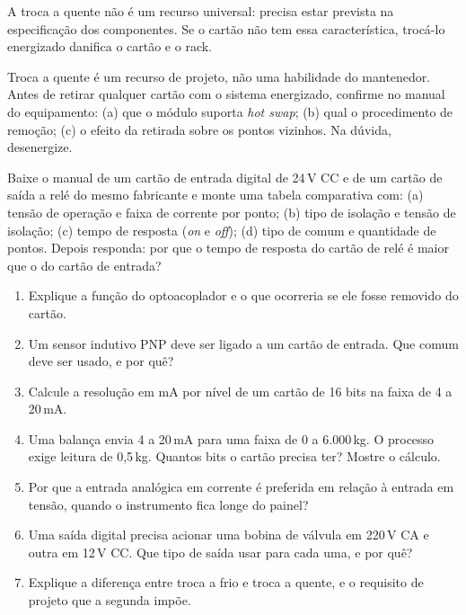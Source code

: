 A troca a quente não é um recurso universal: precisa estar prevista na especificação dos componentes.
Se o cartão não tem essa característica, trocá-lo energizado danifica o cartão e o rack.

\begin{atencao}
Troca a quente é um recurso de projeto, não uma habilidade do mantenedor. Antes de retirar qualquer
cartão com o sistema energizado, confirme no manual do equipamento: (a) que o módulo suporta
\emph{hot swap}; (b) qual o procedimento de remoção; (c) o efeito da retirada sobre os pontos
vizinhos. Na dúvida, desenergize.
\end{atencao}

\begin{pratica}
Baixe o manual de um cartão de entrada digital de 24\,V CC e de um cartão de saída a relé do mesmo
fabricante e monte uma tabela comparativa com:
(a) tensão de operação e faixa de corrente por ponto;
(b) tipo de isolação e tensão de isolação;
(c) tempo de resposta (\emph{on} e \emph{off});
(d) tipo de comum e quantidade de pontos.
Depois responda: por que o tempo de resposta do cartão de relé é maior que o do cartão de entrada?
\end{pratica}

\begin{exercicios}
\begin{enumerate}[label=\alph*)]
  \item Explique a função do optoacoplador e o que ocorreria se ele fosse removido do cartão.
  \item Um sensor indutivo PNP deve ser ligado a um cartão de entrada. Que comum deve ser usado, e
        por quê?
  \item Calcule a resolução em mA por nível de um cartão de 16 bits na faixa de 4 a 20\,mA.
  \item Uma balança envia 4 a 20\,mA para uma faixa de 0 a 6.000\,kg. O processo exige leitura de
        0,5\,kg. Quantos bits o cartão precisa ter? Mostre o cálculo.
  \item Por que a entrada analógica em corrente é preferida em relação à entrada em tensão, quando o
        instrumento fica longe do painel?
  \item Uma saída digital precisa acionar uma bobina de válvula em 220\,V CA e outra em 12\,V CC.
        Que tipo de saída usar para cada uma, e por quê?
  \item Explique a diferença entre troca a frio e troca a quente, e o requisito de projeto que a
        segunda impõe.
\end{enumerate}
\end{exercicios}
